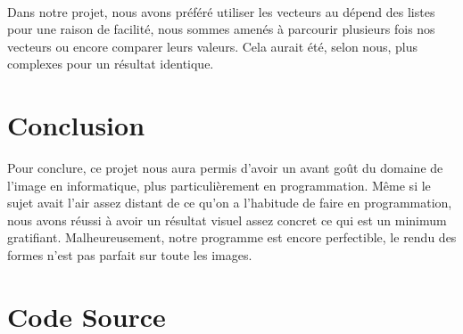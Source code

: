 \documentclass[a4paper , 10pt]{article}
\begin{document}
\paragraph{}
Dans notre projet, nous avons préféré utiliser les vecteurs au dépend des listes pour une raison de facilité, nous sommes amenés à parcourir plusieurs fois nos vecteurs ou encore comparer leurs valeurs. Cela aurait été, selon nous, plus complexes pour un résultat identique.
\section{Conclusion}
\quad Pour conclure, ce projet nous aura permis d'avoir un avant goût du domaine de l'image en informatique, plus particulièrement en programmation. Même si le sujet avait l'air assez distant de ce qu'on a l'habitude de faire en programmation, nous avons réussi à avoir un résultat visuel assez concret ce qui est un minimum gratifiant. Malheureusement, notre programme est encore perfectible, le rendu des formes n'est pas parfait sur toute les images.
\newpage
\section{Code Source }
\end{document}
